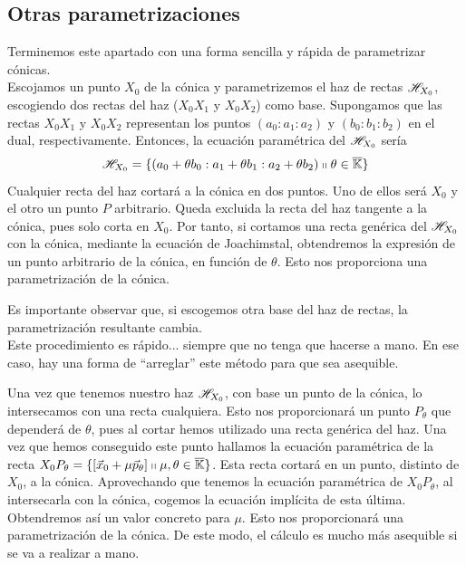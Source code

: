 \subsection{Otras parametrizaciones}
Terminemos este apartado con una forma sencilla y rápida de parametrizar cónicas.\\

Escojamos un punto $X_0$ de la cónica y parametrizemos el haz de rectas $\mathscr{H}_{X_0}$, escogiendo dos rectas del haz ($X_0X_1$ y $X_0X_2$) como base. Supongamos que las rectas $X_0X_1$ y $X_0X_2$ representan los puntos $(a_0:a_1:a_2)$ y $(b_0:b_1:b_2)$ en el dual, respectivamente. Entonces, la ecuación paramétrica del $\mathscr{H}_{X_0}$ sería 
\[\mathscr{H}_{X_0}=\{(a_0+\theta b_0:a_1+\theta b_1:a_2+\theta b_2)\shortparallel \theta\in\overline{\mathbb{K}}\}\]
Cualquier recta del haz cortará a la cónica en dos puntos. Uno de ellos será $X_0$ y el otro un punto $P$ arbitrario. Queda excluida la recta del haz tangente a la cónica, pues solo corta en $X_0$. Por tanto, si cortamos una recta genérica del $\mathscr{H}_{X_0}$ con la cónica, mediante la ecuación de Joachimstal, obtendremos la expresión de un punto arbitrario de la cónica, en función de $\theta$. Esto nos proporciona una parametrización de la cónica.

Es importante observar que, si escogemos otra base del haz de rectas, la parametrización resultante cambia.\\

Este procedimiento es rápido... siempre que no tenga que hacerse a mano. En ese caso, hay una forma de ``arreglar'' este método para que sea asequible. 

Una vez que tenemos nuestro haz $\mathscr{H}_{X_0}$, con base un punto de la cónica, lo intersecamos con una recta cualquiera. Esto nos proporcionará un punto $P_\theta$ que dependerá de $\theta$, pues al cortar hemos utilizado una recta genérica del haz. Una vez que hemos conseguido este punto hallamos la ecuación paramétrica de la recta $X_0P_\theta=\{\left [ \vec{x}_0+\mu \vec{p}_\theta \right ]\shortparallel \mu,\theta\in\overline{\mathbb{K}}\}$. Esta recta cortará en un punto, distinto de $X_0$, a la cónica. Aprovechando que tenemos la ecuación paramétrica de $X_0P_\theta$, al intersecarla con la cónica, cogemos la ecuación implícita de esta última. Obtendremos así un valor concreto para $\mu$. Esto nos proporcionará una parametrización de la cónica. De este modo, el cálculo es mucho más asequible si se va a realizar a mano.
